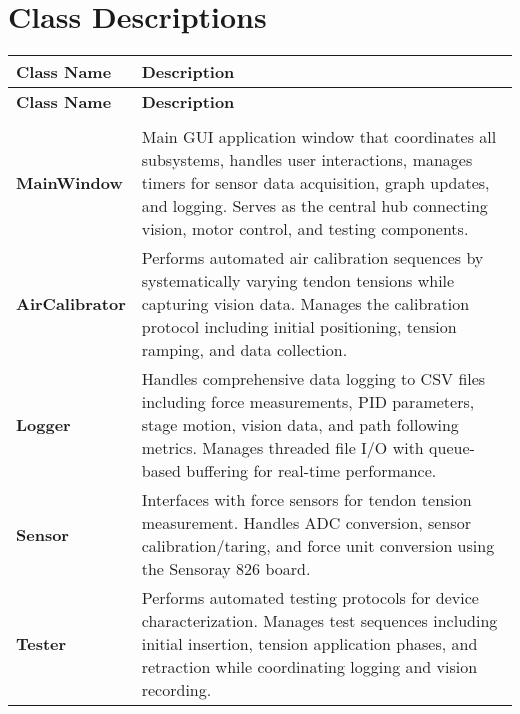 \newpage
{} %
\section{Class Descriptions}
\begin{longtable}{|>{\raggedright\arraybackslash}p{}|>{\raggedright\arraybackslash}p{}|}
\toprule
\textbf{Class Name} & \textbf{Description} \\
\midrule
\endfirsthead

\toprule
\textbf{Class Name} & \textbf{Description} \\
\midrule
\endhead

\bottomrule
\endfoot

\bottomrule
\endlastfoot

\rowcolor{folderblue}
\multicolumn{2}{|c|}{\textcolor{white}{\textbf{\large  Root Directory (Ribbot/)}}} \\
\midrule
\cellcolor{lightblue}\textbf{MainWindow} & Main GUI application window that coordinates all subsystems, handles user interactions, manages timers for sensor data acquisition, graph updates, and logging. Serves as the central hub connecting vision, motor control, and testing components. \\
\hline
\cellcolor{lightblue}\textbf{AirCalibrator} & Performs automated air calibration sequences by systematically varying tendon tensions while capturing vision data. Manages the calibration protocol including initial positioning, tension ramping, and data collection. \\
\hline
\cellcolor{lightblue}\textbf{Logger} & Handles comprehensive data logging to CSV files including force measurements, PID parameters, stage motion, vision data, and path following metrics. Manages threaded file I/O with queue-based buffering for real-time performance. \\
\hline
\cellcolor{lightblue}\textbf{Sensor} & Interfaces with force sensors for tendon tension measurement. Handles ADC conversion, sensor calibration/taring, and force unit conversion using the Sensoray 826 board. \\
\hline
\cellcolor{lightblue}\textbf{Tester} & Performs automated testing protocols for device characterization. Manages test sequences including initial insertion, tension application phases, and retraction while coordinating logging and vision recording. \\
\midrule


\end{longtable}
